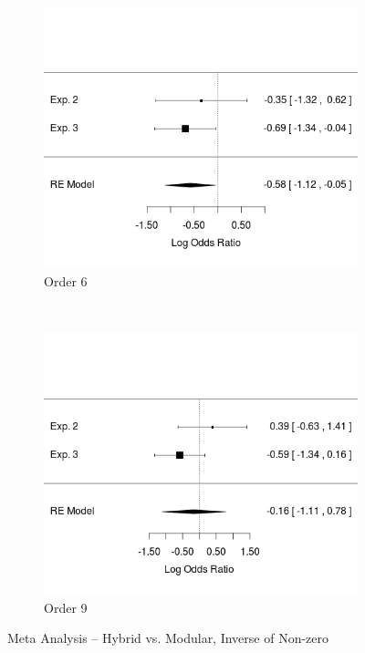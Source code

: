 \documentclass[11pt]{article}
\begin{document}
\begin{figure}[H]
\centering
\begin{subfigure}[c]{0.4\textwidth}
\centering
\includegraphics[width=\textwidth]{figures/meta/h_in_NZ_6.png}
\caption{Order 6}
\end{subfigure}
~
\begin{subfigure}[c]{0.4\textwidth}
\centering
\includegraphics[width=\textwidth]{figures/meta/h_in_NZ_9.png}
\caption{Order 9}
\end{subfigure}
\caption{Meta Analysis -- Hybrid vs. Modular, Inverse of Non-zero}
\label{meta_inNZ_h}
\end{figure}\noindent 
\end{document}
